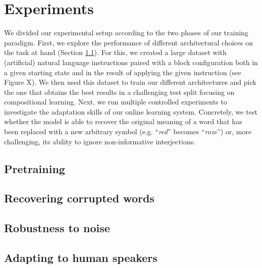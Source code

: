 \section{Experiments}

We divided our experimental setup according to the two phases of our training 
paradigm. First, we explore the performance of different architectural choices 
on the task at hand (Section \ref{sec:pretraining}). For this, we created a 
large dataset with (artificial) natural language instructions paired with a 
block configuration both in a given starting state and in the result of 
applying the given instruction (see Figure X). We then used this dataset to 
train our different architectures and pick the one that obtains the best 
results in a challenging test split focusing on compositional learning.
Next, we run multiple controlled experiments to investigate the adaptation 
skills of our online learning system. Concretely, we test whether the model is 
able to recover the original meaning of a word that has been replaced with a 
new arbitrary symbol (e.g. ``\emph{red}'' becomes ``\emph{roze}'') or, more 
challenging, its ability to ignore non-informative interjections.
 
\subsection{Pretraining}
\label{sec:pretraining}

\subsection{Recovering corrupted words}

\subsection{Robustness to noise}

\subsection{Adapting to human speakers}